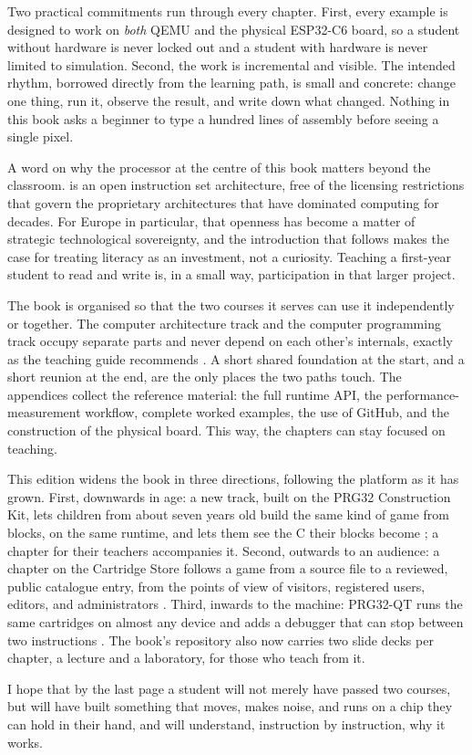 Two practical commitments run through every chapter. First, every example is
designed to work on \emph{both} QEMU and the physical ESP32\nobreakdash-C6 board, so a
student without hardware is never locked out and a student with hardware is never
limited to simulation. Second, the work is incremental and visible. The intended
rhythm, borrowed directly from the \prg learning path, is small and concrete:
change one thing, run it, observe the result, and write down what changed.
Nothing in this book asks a beginner to type a hundred lines of assembly before
seeing a single pixel.

A word on why the processor at the centre of this book matters beyond the
classroom. \riscv is an open instruction set architecture, free of the licensing
restrictions that govern the proprietary architectures that have dominated
computing for decades. For Europe in particular, that openness has become a
matter of strategic technological sovereignty, and the introduction that follows
makes the case for treating \riscv literacy as an investment, not a curiosity.
Teaching a first-year student to read and write \riscv is, in a small way,
participation in that larger project.

The book is organised so that the two courses it serves can use it independently
or together. The computer architecture track and the computer programming track
occupy separate parts and never depend on each other's internals, exactly as the
\prg teaching guide recommends \citep{prg32teaching}. A short shared foundation at
the start, and a short reunion at the end, are the only places the two paths
touch. The appendices collect the reference material: the full runtime API, the
performance-measurement workflow, complete worked examples, the use of GitHub,
and the construction of the physical board. This way, the chapters can stay
focused on teaching.

This edition widens the book in three directions, following the platform as it
has grown. First, downwards in age: a new track, built on the PRG32 Construction
Kit, lets children from about seven years old build the same kind of game from
blocks, on the same runtime, and lets them see the C their blocks become
\citep{prg32kit}; a chapter for their teachers accompanies it. Second, outwards
to an audience: a chapter on the Cartridge Store follows a game from a source
file to a reviewed, public catalogue entry, from the points of view of visitors,
registered users, editors, and administrators \citep{prg32store}. Third, inwards
to the machine: PRG32-QT runs the same cartridges on almost any device and adds
a debugger that can stop between two instructions \citep{prg32qt}. The book's
repository also now carries two slide decks per chapter, a lecture and a
laboratory, for those who teach from it.

I hope that by the last page a student will not merely have passed two courses,
but will have built something that moves, makes noise, and runs on a chip they
can hold in their hand, and will understand, instruction by instruction, why it
works.
